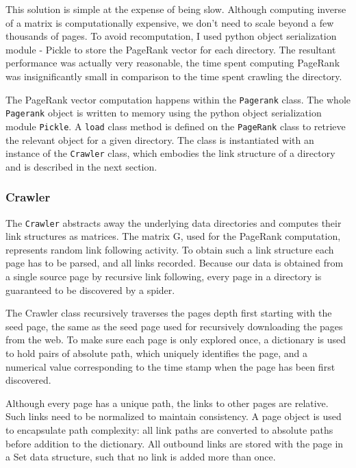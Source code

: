 \documentclass[12pt,notitlepage,twoside]{scrreprt}
\begin{document}
This solution is simple at the expense of being slow. Although computing
inverse of a matrix is computationally expensive, we don't need to scale beyond
a few thousands of pages.  To avoid recomputation, I used python object
serialization module - Pickle to store the PageRank vector for each directory.
The resultant performance was actually very reasonable, the time spent
computing PageRank was insignificantly small in comparison to the time spent
crawling the directory.

The PageRank vector computation happens within the \texttt{Pagerank} class. The
whole \texttt{Pagerank} object is written to memory using the python object
serialization module \texttt{Pickle}. A \texttt{load} class method is defined
on the \texttt{PageRank} class to retrieve the relevant object for a given
directory. The class is instantiated with an instance of the \texttt{Crawler}
class, which embodies the link structure of a directory and is described in the
next section.

\subsubsection*{Crawler} 

The \texttt{Crawler} abstracts away the underlying data directories and
computes their link structures as matrices.  The matrix G, used for the
PageRank computation, represents random link following activity.  To obtain
such a link structure each page has to be parsed, and all links recorded.
Because our data is obtained from a single source page by recursive link
following, every page in a directory is guaranteed to be discovered by a
spider.

The Crawler class recursively traverses the pages depth first starting with the
seed page, the same as the seed page used for recursively downloading the pages
from the web. To make sure each page is only explored once, a dictionary is
used to hold pairs of absolute path, which uniquely identifies the page, and a
numerical value corresponding to the time stamp when the page has been first
discovered.

Although every page has a unique path, the links to other pages are relative.
Such links need to be normalized to maintain consistency.  A page object is
used to encapsulate path complexity: all link paths are converted to absolute
paths before addition to the dictionary.  All outbound links are stored with
the page in a Set data structure, such that no link is added more than once. 
\end{document}
